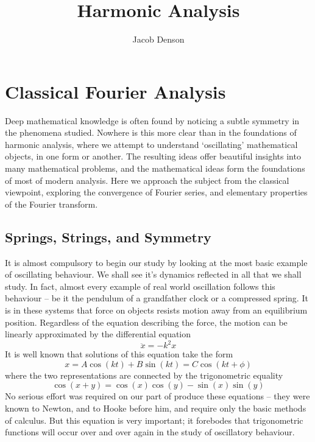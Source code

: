 

\DeclareMathOperator{\Dom}{Dom}

\title{Harmonic Analysis}
\author{Jacob Denson}




\maketitle

\tableofcontents


\part{Classical Fourier Analysis}

Deep mathematical knowledge is often found by noticing a subtle symmetry in the phenomena studied. Nowhere is this more clear than in the foundations of harmonic analysis, where we attempt to understand `oscillating' mathematical objects, in one form or another. The resulting ideas offer beautiful insights into many mathematical problems, and the mathematical ideas form the foundations of most of modern analysis. Here we approach the subject from the classical viewpoint, exploring the convergence of Fourier series, and elementary properties of the Fourier transform.

\chapter{Springs, Strings, and Symmetry}

It is almost compulsory to begin our study by looking at the most basic example of oscillating behaviour. We shall see it's dynamics reflected in all that we shall study. In fact, almost every example of real world oscillation follows this behaviour -- be it the pendulum of a grandfather clock or a compressed spring. It is in these systems that force on objects resists motion away from an equilibrium position. Regardless of the equation describing the force, the motion can be linearly approximated by the differential equation
%
\[ \ddot{x} = -k^2x \]
%
It is well known that solutions of this equation take the form
%
\[ x = A \cos(kt) + B \sin(kt) = C \cos(kt + \phi) \]
%
where the two representations are connected by the trigonometric equality
%
\[ \cos(x + y) = \cos(x) \cos(y) - \sin(x) \sin(y) \]
%
No serious effort was required on our part of produce these equations -- they were known to Newton, and to Hooke before him, and require only the basic methods of calculus. But this equation is very important; it forebodes that trigonometric functions will occur over and over again in the study of oscillatory behaviour.

